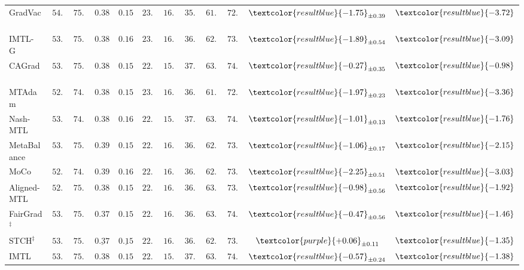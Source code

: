 \begin{table}[t]
{\begin{tabular}{lccccccccccc}
GradVac~\citep{wang2021GradVac} & $54.21$ & $75.67$ & $0.3859$ & $0.1583$ & $23.58$ & $16.91$ & $35.34$ & $61.15$ & $72.10$ & $\textcolor{resultblue}{-1.75}_{\pm0.39}$  & $\textcolor{resultblue}{-3.72}$         \\
IMTL-G~\citep{liu2021IMTL} & $53.01$ & $75.04$ & $0.3888$ & $0.1603$ & $23.08$ & $16.43$ & $36.24$ & $62.23$ & $73.06$ & $\textcolor{resultblue}{-1.89}_{\pm0.54}$     & $\textcolor{resultblue}{-3.09}$     \\
CAGrad~\citep{liu2021CAGrad}  & $53.97$ & $75.54$ & $0.3885$ & $0.1588$ & $22.47$ & $15.71$ & $37.77$ & $63.82$ & $74.30$ & $\textcolor{resultblue}{-0.27}_{\pm0.35}$    &    $\textcolor{resultblue}{-0.98}$    \\
MTAdam~\citep{malkiel2021MTAdam} & $52.67$ & $74.86$ & $0.3873$ & $0.1583$ & $23.26$ & $16.55$ & $36.00$ & $61.92$ & $72.74$ & $\textcolor{resultblue}{-1.97}_{\pm0.23}$   &      $\textcolor{resultblue}{-3.36}$ \\
Nash-MTL~\citep{navon2022NashMTL} & $53.41$ & $74.95$ & $0.3867$ & $0.1612$ & $22.57$ & $15.94$ & $37.30$ & $63.40$ & $74.09$ & $\textcolor{resultblue}{-1.01}_{\pm0.13}$   & $\textcolor{resultblue}{-1.76}$       \\
MetaBalance~\citep{he2022MetaBalance} & $53.92$ & $75.57$ & $0.3901$ & $0.1594$ & $22.85$ & $16.16$ & $36.72$ & $62.91$ & $73.62$ & $\textcolor{resultblue}{-1.06}_{\pm0.17}$     &      $\textcolor{resultblue}{-2.15}$      \\
MoCo~\citep{fernando2023MoCo} & $52.25$ & $74.56$ & $0.3920$ & $0.1622$ & $22.82$ & $16.24$ & $36.58$ & $62.72$ & $73.49$ & $\textcolor{resultblue}{-2.25}_{\pm0.51}$    &  $\textcolor{resultblue}{-3.03}$     \\
Aligned-MTL~\citep{senushkin2023AlignedMTL} & $52.94$ & $75.00$ & $0.3884$ & $0.1570$ & $22.65$ & $16.07$ & $36.88$ & $63.18$ & $73.94$ & $\textcolor{resultblue}{-0.98}_{\pm0.56}$   &  $\textcolor{resultblue}{-1.92}$                        \\
FairGrad$^\ddag$~\citep{icml24FairGrad} &$53.01$  &$75.14$  &$0.3795$  & $0.1573$ & $22.51$ &$16.02$  &$36.93$  & $63.39$ & $74.17$ & $\textcolor{resultblue}{-0.47}_{\pm0.56}$ & $\textcolor{resultblue}{-1.46}$   \\
STCH$^\ddag$~\citep{icml24STCH} &$53.86$  &$75.49$  &$\underline{0.3759}$  & $\underline{0.1547}$ & $22.69$ &$16.17$  &$36.70$  & $62.96$ & $73.82$ & $\textcolor{purple}{+0.06}_{\pm0.11}$   & $\textcolor{resultblue}{-1.35}$   \\
\midrule
IMTL~\citep{liu2021IMTL} & $53.63$ & $75.44$ & $0.3868$ & $0.1592$ & $22.58$ & $15.85$ & $37.44$ & $63.52$ & $74.09$ & $\textcolor{resultblue}{-0.57}_{\pm0.24}$  & $\textcolor{resultblue}{-1.38}$   \\

\end{tabular}}
\end{table}
